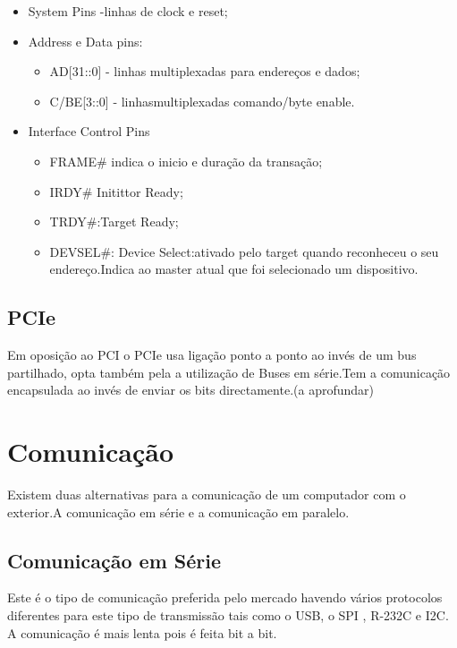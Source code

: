 \documentclass[10pt,a4paper]{paper}
\begin{document}
	\begin{itemize}
		\item System Pins -linhas de clock e reset;
		\item Address e Data pins:
		\begin{itemize}
			\item AD[31::0] - linhas multiplexadas para endereços e dados;
			\item C/BE[3::0] - linhasmultiplexadas comando/byte enable.
		\end{itemize}
		\item Interface Control Pins
		\begin{itemize}
			\item FRAME\# indica o inicio e duração da transação;
			\item IRDY\# Initittor Ready;
			\item TRDY\#:Target Ready;
			\item DEVSEL\#: Device Select:ativado pelo target quando reconheceu o seu endereço.Indica ao master atual que foi selecionado um dispositivo.
		\end{itemize}
	\end{itemize}
	
	
	\subsection*{PCIe}
	
	Em oposição ao PCI  o PCIe usa ligação ponto a ponto ao invés de um bus partilhado, opta também pela a utilização de Buses em série.Tem a comunicação encapsulada ao invés de enviar os bits directamente.(a aprofundar)
	
	
	\section*{Comunicação}
	
	Existem duas alternativas para a comunicação de um computador com o exterior.A comunicação em série e a comunicação em paralelo.
	
	\subsection*{Comunicação em Série}
		
		Este é o tipo de comunicação preferida pelo mercado havendo vários protocolos diferentes para este tipo de transmissão tais como o USB, o SPI , R-232C e I2C.
		A comunicação é mais lenta pois é feita bit a bit.
	
\end{document}
